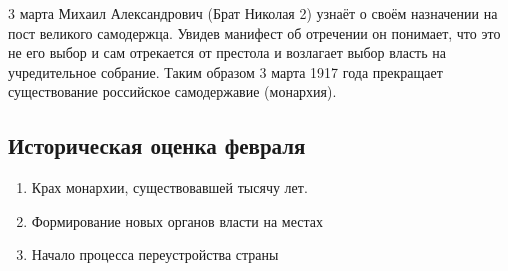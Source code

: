3 марта Михаил Александрович (Брат Николая 2) узнаёт о своём назначении на пост великого самодержца. Увидев манифест об отречении он понимает, что это не его выбор и сам отрекается от престола и возлагает выбор власть на учредительное собрание. Таким образом 3 марта 1917 года прекращает существование российское самодержавие (монархия).

\subsection{Историческая оценка февраля}
\begin{enumerate}
    \item Крах монархии, существовавшей тысячу лет. \\
    \item Формирование новых органов власти на местах \\
    \item Начало процесса переустройства страны
\end{enumerate}
